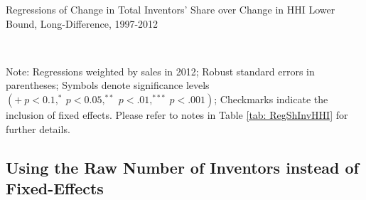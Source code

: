 \begin{table}[h]
\caption{Regressions of Change in Total Inventors' Share over Change in HHI
Lower Bound, Long-Difference, 1997-2012\label{tab: RegTotShare}}

\begin{centering}
\scalebox{.7}{}\\
\par\end{centering}
\raggedright{}{\small{}Note: Regressions weighted by sales in 2012;
Robust standard errors in parentheses; Symbols denote significance
levels $\left(+\ p<0.1,^{*}\ p<0.05,^{**}\ p<.01,^{***}\ p<.001\right)$;
Checkmarks indicate the inclusion of fixed effects. Please refer to
notes in Table \ref{tab: RegShInvHHI} for further details.}{\small\par}
\end{table}


\subsection{Using the Raw Number of Inventors instead of Fixed-Effects\label{app: Using-N-inv}}

